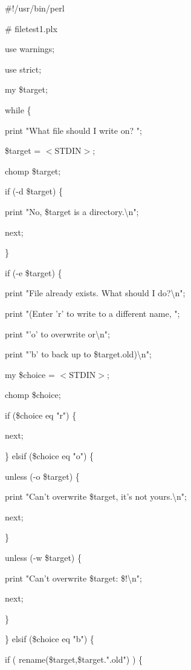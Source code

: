\documentclass[a4paper,11pt]{book}
\begin{document}
\noindent 

\noindent \#!/usr/bin/perl

\noindent \# filetest1.plx

\noindent use warnings;

\noindent use strict;

\noindent 

\noindent 

\noindent my \$target;

\noindent while \{

\noindent print "What file should I write on? ";

\noindent \$target = $<$STDIN$>$;

\noindent chomp \$target;

\noindent if (-d \$target) \{

\noindent print "No, \$target is a directory.\textbackslash n";

\noindent next;

\noindent \}

\noindent if (-e \$target) \{

\noindent print "File already exists. What should I do?\textbackslash n";

\noindent print "(Enter 'r' to write to a different name, ";

\noindent print "'o' to overwrite or\textbackslash n";

\noindent print "'b' to back up to \$target.old)\textbackslash n";

\noindent my \$choice = $<$STDIN$>$;

\noindent chomp \$choice;

\noindent if (\$choice eq "r") \{

\noindent next;

\noindent \} elsif (\$choice eq "o") \{

\noindent unless (-o \$target) \{

\noindent print "Can't overwrite \$target, it's not yours.\textbackslash n";

\noindent next;

\noindent \}

\noindent unless (-w \$target) \{

\noindent print "Can't overwrite \$target: \$!\textbackslash n";

\noindent next;

\noindent \}

\noindent \} elsif (\$choice eq "b") \{

\noindent if ( rename(\$target,\$target.".old") ) \{
\end{document}
